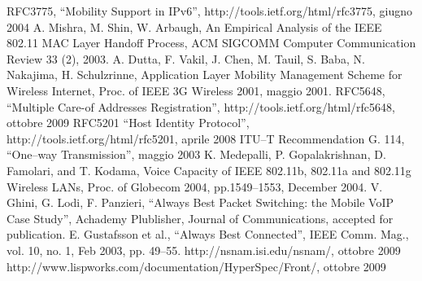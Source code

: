 \documentclass[12pt,a4paper,openright,twoside]{book}
\begin{document}
\begin{thebibliography}{90}
\rhead[\fancyplain{}{\bfseries \leftmark}]{\fancyplain{}{\bfseries
\thepage}}
 RFC3775, ``Mobility Support in IPv6'',
  http://tools.ietf.org/html/rfc3775, giugno 2004
 A. Mishra, M. Shin, W. Arbaugh, An
  Empirical Analysis of the IEEE 802.11 MAC Layer Handoff Process, ACM
  SIGCOMM Computer Communication Review 33 (2), 2003.
 A. Dutta, F. Vakil, J. Chen,
  M. Tauil, S. Baba, N. Nakajima, H.  Schulzrinne, Application Layer
  Mobility Management Scheme for Wireless Internet, Proc. of IEEE 3G
  Wireless 2001, maggio 2001.
 RFC5648, ``Multiple Care-of Addresses
  Registration'', http://tools.ietf.org/html/rfc5648, ottobre 2009
 RFC5201 ``Host Identity Protocol'',
  http://tools.ietf.org/html/rfc5201, aprile 2008
 ITU--T Recommendation G. 114, ``One--way
  Transmission'', maggio 2003
 K. Medepalli, P. Gopalakrishnan, D. Famolari,
  and T. Kodama, Voice Capacity of IEEE 802.11b, 802.11a and 802.11g
  Wireless LANs, Proc. of Globecom 2004, pp.1549–1553, December 2004.
 V. Ghini, G. Lodi, F. Panzieri, ``Always Best
  Packet Switching: the Mobile VoIP Case Study'', Achademy Plublisher,
  Journal of Communications, accepted for publication.
 E. Gustafsson et al., ``Always Best Connected'',
  IEEE Comm. Mag., vol. 10, no. 1, Feb 2003, pp. 49--55.
 http://nsnam.isi.edu/nsnam/, ottobre 2009
  http://www.lispworks.com/documentation/HyperSpec/Front/,
  ottobre 2009
\end{thebibliography}
\end{document}
